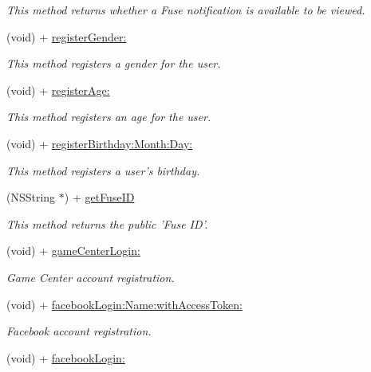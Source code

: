 \begin{DoxyCompactItemize}
\begin{DoxyCompactList}\small\item\em This method returns whether a Fuse notification is available to be viewed. \end{DoxyCompactList}\item 
(void) + \hyperlink{interface_fuse_s_d_k_a2b0c7be7abc4ec4ae6912f295d21e64c}{register\+Gender\+:}
\begin{DoxyCompactList}\small\item\em This method registers a gender for the user. \end{DoxyCompactList}\item 
(void) + \hyperlink{interface_fuse_s_d_k_a33903ca8d52be440186c4bbf1cbe510c}{register\+Age\+:}
\begin{DoxyCompactList}\small\item\em This method registers an age for the user. \end{DoxyCompactList}\item 
(void) + \hyperlink{interface_fuse_s_d_k_a5dcbaec8b00d90c4970e1b752e5dc719}{register\+Birthday\+:\+Month\+:\+Day\+:}
\begin{DoxyCompactList}\small\item\em This method registers a user's birthday. \end{DoxyCompactList}\item 
(N\+S\+String $\ast$) + \hyperlink{interface_fuse_s_d_k_ab483c2a3f4439aad8e19200cf24ff731}{get\+Fuse\+I\+D}
\begin{DoxyCompactList}\small\item\em This method returns the public 'Fuse I\+D'. \end{DoxyCompactList}\item 
(void) + \hyperlink{interface_fuse_s_d_k_a02a3bc5562d4f6e50bac5339f4ac4046}{game\+Center\+Login\+:}
\begin{DoxyCompactList}\small\item\em Game Center account registration. \end{DoxyCompactList}\item 
(void) + \hyperlink{interface_fuse_s_d_k_a7003a2102cba9c87fa127e39c95a5d1d}{facebook\+Login\+:\+Name\+:with\+Access\+Token\+:}
\begin{DoxyCompactList}\small\item\em Facebook account registration. \end{DoxyCompactList}\item 
(void) + \hyperlink{interface_fuse_s_d_k_a04c181e3ec49e81ba081a5041df412f6}{facebook\+Login\+:}

\end{DoxyCompactItemize}
